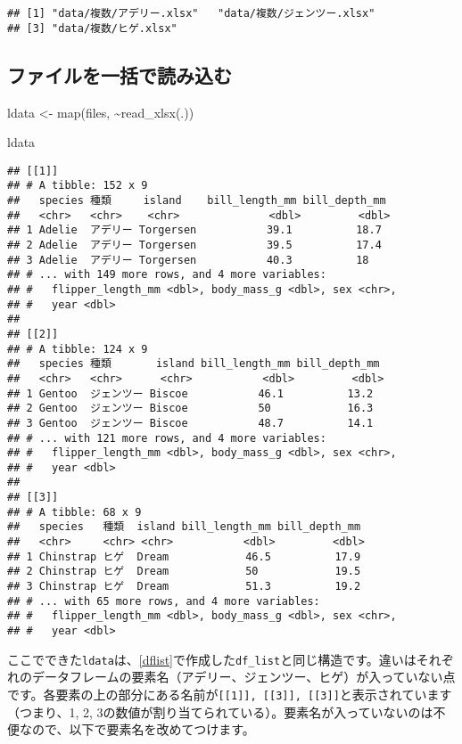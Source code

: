 \documentclass[
  xelatex,ja=standard, b5paper]{bxjsbook}
\newenvironment{Shaded}{\begin{snugshade}}{\end{snugshade}}
\newcommand{\FunctionTok}[1]{\textcolor[rgb]{0.00,0.00,0.00}{#1}}
\newcommand{\NormalTok}[1]{#1}
\newcommand{\OtherTok}[1]{\textcolor[rgb]{0.56,0.35,0.01}{#1}}
\newcommand{\SpecialCharTok}[1]{\textcolor[rgb]{0.00,0.00,0.00}{#1}}
\begin{document}
\begin{verbatim}
## [1] "data/複数/アデリー.xlsx"   "data/複数/ジェンツー.xlsx"
## [3] "data/複数/ヒゲ.xlsx"
\end{verbatim}

\hypertarget{ikkatsuread}{%
\subsection{ファイルを一括で読み込む}\label{ikkatsuread}}

\begin{Shaded}
\begin{Highlighting}[]
\NormalTok{ldata }\OtherTok{\textless{}{-}}
    \FunctionTok{map}\NormalTok{(files, }\SpecialCharTok{\textasciitilde{}}\FunctionTok{read\_xlsx}\NormalTok{(.))}

\NormalTok{ldata}
\end{Highlighting}
\end{Shaded}

\begin{verbatim}
## [[1]]
## # A tibble: 152 x 9
##   species 種類     island    bill_length_mm bill_depth_mm
##   <chr>   <chr>    <chr>              <dbl>         <dbl>
## 1 Adelie  アデリー Torgersen           39.1          18.7
## 2 Adelie  アデリー Torgersen           39.5          17.4
## 3 Adelie  アデリー Torgersen           40.3          18  
## # ... with 149 more rows, and 4 more variables:
## #   flipper_length_mm <dbl>, body_mass_g <dbl>, sex <chr>,
## #   year <dbl>
## 
## [[2]]
## # A tibble: 124 x 9
##   species 種類       island bill_length_mm bill_depth_mm
##   <chr>   <chr>      <chr>           <dbl>         <dbl>
## 1 Gentoo  ジェンツー Biscoe           46.1          13.2
## 2 Gentoo  ジェンツー Biscoe           50            16.3
## 3 Gentoo  ジェンツー Biscoe           48.7          14.1
## # ... with 121 more rows, and 4 more variables:
## #   flipper_length_mm <dbl>, body_mass_g <dbl>, sex <chr>,
## #   year <dbl>
## 
## [[3]]
## # A tibble: 68 x 9
##   species   種類  island bill_length_mm bill_depth_mm
##   <chr>     <chr> <chr>           <dbl>         <dbl>
## 1 Chinstrap ヒゲ  Dream            46.5          17.9
## 2 Chinstrap ヒゲ  Dream            50            19.5
## 3 Chinstrap ヒゲ  Dream            51.3          19.2
## # ... with 65 more rows, and 4 more variables:
## #   flipper_length_mm <dbl>, body_mass_g <dbl>, sex <chr>,
## #   year <dbl>
\end{verbatim}

ここでできた\texttt{ldata}は、\ref{dflist}で作成した\texttt{df\_list}と同じ構造です。違いはそれぞれのデータフレームの要素名（アデリー、ジェンツー、ヒゲ）が入っていない点です。各要素の上の部分にある名前が\texttt{{[}{[}1{]}{]},\ {[}{[}3{]}{]},\ {[}{[}3{]}{]}}と表示されています（つまり、1, 2, 3の数値が割り当てられている）。要素名が入っていないのは不便なので、以下で要素名を改めてつけます。
\end{document}
